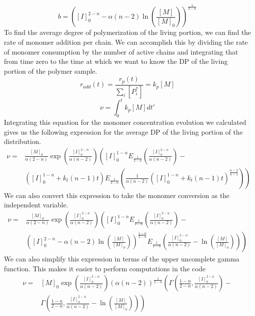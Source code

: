 \documentclass[12pt]{article}
\begin{document}
\begin{equation}
  b = \left([I]_0^{2-n}-\alpha(n-2)\ln\left(\frac{[M]}{[M]_0}\right)\right)^{\frac{1}{2-n}}
\end{equation}
To find the average degree of polymerization of the living portion, we can find the rate of monomer addition per chain. We can accomplish this by dividing the rate of monomer consumption by the number of active chains and integrating that from time zero to the time at which we want to know the DP of the living portion of the polymer sample.
\begin{equation}
  r_{add}(t) = \frac{r_p(t)}{\sum_i[P_i^*]} = k_p[M]
\end{equation}
\begin{equation}
  \nu = \int_0^tk_p[M]dt'
\end{equation}
Integrating this equation for the monomer concentration evolution we calculated gives us the following expression for the average DP of the living portion of the distribution.
\begin{equation}
  \begin{split}
    \nu = & \frac{[M]_0}{\alpha(2-n)}\exp\left(\frac{[I]_0^{2-n}}{\alpha(n-2)}\right)\left([I]_0^{1-n}E_{\frac{1}{2-n}}\left(\frac{[I]_0^{2-n}}{\alpha(n-2)}\right)-\right.\\
          & \left.\left([I]_0^{1-n}+k_t(n-1)t\right)E_{\frac{1}{2-n}}\left(\frac{1}{\alpha(n-2)}\left([I]_0^{1-n}+k_t(n-1)t\right)^{\frac{n-2}{n-1}}\right)\right)
  \end{split}
\end{equation}
We can also convert this expression to take the monomer conversion as the independent variable.
\begin{equation}
  \begin{split}
    \nu = & \frac{[M]_0}{\alpha(2-n)}\exp\left(\frac{[I]_0^{2-n}}{\alpha(n-2)}\right)\left([I]_0^{1-n}E_{\frac{1}{2-n}}\left(\frac{[I]_0^{2-n}}{\alpha(n-2)}\right)-\right.\\
          & \left.\left([I]_0^{2-n}-\alpha(n-2)\ln\left(\frac{[M]}{[M]_0}\right)\right)^{\frac{1-n}{2-n}}E_{\frac{1}{2-n}}\left(\frac{[I]_0^{2-n}}{\alpha(n-2)}-\ln\left(\frac{[M]}{[M]_0}\right)\right)\right)
  \end{split}
\end{equation}
We can also simplify this expression in terms of the upper uncomplete gamma function. This makes it easier to perform computations in the code
\begin{equation}
  \begin{split}
    \nu = & [M]_0\exp\left(\frac{[I]_0^{2-n}}{\alpha(n-2)}\right)\left(\alpha(n-2)\right)^{\frac{1}{2-n}}\left(\Gamma\left(\frac{1-n}{2-n},\frac{[I]_0^{2-n}}{\alpha(n-2)}\right)-\right.\\
          & \left.\Gamma\left(\frac{1-n}{2-n},\frac{[I]_0^{2-n}}{\alpha(n-2)}-\ln\left(\frac{[M]}{[M]_0}\right)\right)\right)
  \end{split}
\end{equation}
\end{document}
